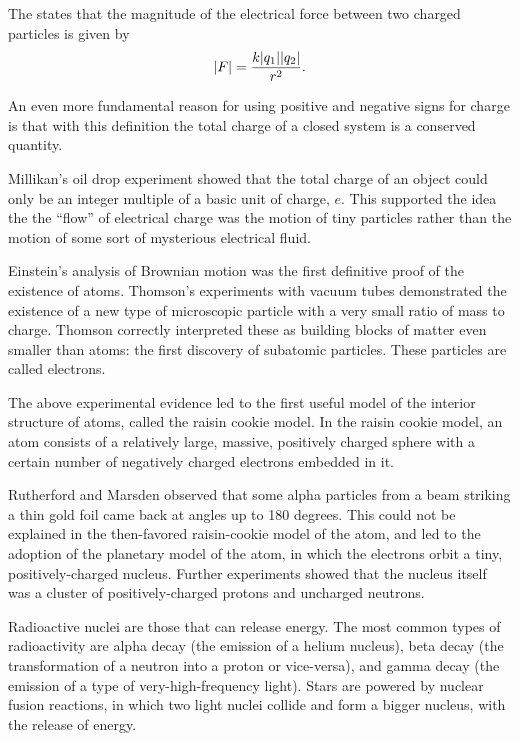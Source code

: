 	The  states that the magnitude of the
	electrical force between two charged particles is given by
	\begin{equation*}
		|F| = \frac{k|q_1||q_2|}{r^2}.
	\end{equation*}
	
	 An even more fundamental reason for
	using positive and negative signs for charge is that with
	this definition the total charge of a closed system is
	a conserved quantity.
	
	 Millikan's oil drop experiment
	showed that the total charge of an object could only be an
	integer multiple of a basic unit of charge, $e$. This
	supported the idea the the ``flow'' of electrical charge was
	the motion of tiny particles rather than the motion of some
	sort of mysterious electrical fluid.
	
	Einstein's analysis of Brownian motion was the first
	definitive proof of the existence of atoms. Thomson's
	experiments with vacuum tubes demonstrated the existence of
	a new type of microscopic particle with a very small ratio
	of mass to charge. Thomson correctly interpreted these as
	building blocks of matter even smaller than atoms: the first
	discovery of subatomic particles. These particles are called electrons.
	
	The above experimental evidence led to the first useful
	model of the interior structure of atoms, called the raisin
	 cookie model. In the raisin  cookie model, an atom
	consists of a relatively large, massive, positively charged
	sphere with a certain number of negatively charged
	electrons embedded in it.
	
	Rutherford and Marsden observed that some alpha particles
	from a beam striking a thin gold foil came back at angles up
	to 180 degrees. This could not be explained in the
	then-favored raisin-cookie model of the atom, and led to
	the adoption of the planetary model of the atom, in which
	the electrons orbit a tiny, positively-charged nucleus.
	Further experiments showed that the nucleus itself was a
	cluster of positively-charged protons and uncharged neutrons.
	
	Radioactive nuclei are those that can release energy. The
	most common types of radioactivity are alpha decay (the
	emission of a helium nucleus), beta decay (the transformation
	of a neutron into a proton or vice-versa), and gamma decay
	(the emission of a type of very-high-frequency light). Stars
	are powered by nuclear fusion reactions, in which two light
	nuclei collide and form a bigger nucleus, with the release of energy.
	
